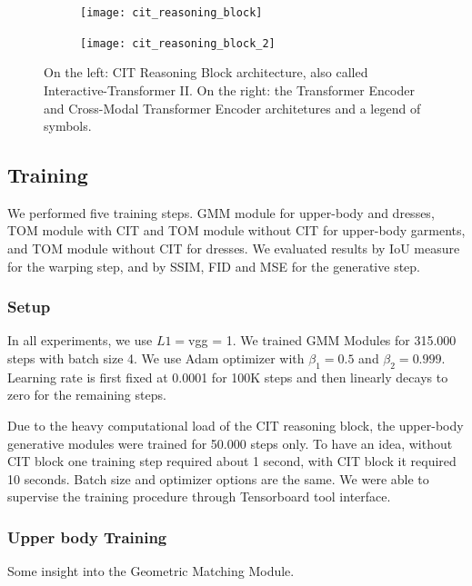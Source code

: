 \FloatBarrier
\begin{figure}[h]
\centering
\begin{subfigure}{0.7\linewidth}
  \centering
  \texttt{[image: cit\_reasoning\_block]}
  \label{fig:sub1}
\end{subfigure}%
\begin{subfigure}{0.3\linewidth}
  \centering
  \texttt{[image: cit\_reasoning\_block\_2]}
  \label{fig:sub2}
\end{subfigure}
\caption{On the left: CIT Reasoning Block architecture, also called Interactive-Transformer II. On the right: the Transformer Encoder and Cross-Modal Transformer Encoder architetures and a legend of symbols.}
\label{fig:cit_architecture}
\end{figure}
\FloatBarrier

\subsection{Training}
We performed five training steps. GMM module for upper-body and dresses, TOM module with CIT and TOM module without CIT for upper-body garments, and TOM module without CIT for dresses. We evaluated results by IoU measure for the warping step, and by SSIM, FID and MSE for the generative step.
\subsubsection{Setup}
In all experiments, we use $L1 = $vgg = 1. We trained GMM Modules for 315.000 steps with batch size 4. We use Adam optimizer with $\beta_1 = 0.5$ and $\beta_2 = 0.999$. 
Learning rate is first fixed at 0.0001 for 100K steps and then linearly decays to zero for the remaining steps.

Due to the heavy computational load of the CIT reasoning block, the upper-body generative modules were trained for 50.000 steps only. To have an idea, without CIT block one training step required about 1 second, with CIT block it required 10 seconds. Batch size and optimizer options are the same.
We were able to supervise the training procedure through Tensorboard tool interface.

\subsubsection{Upper body Training}

Some insight into the Geometric Matching Module.

